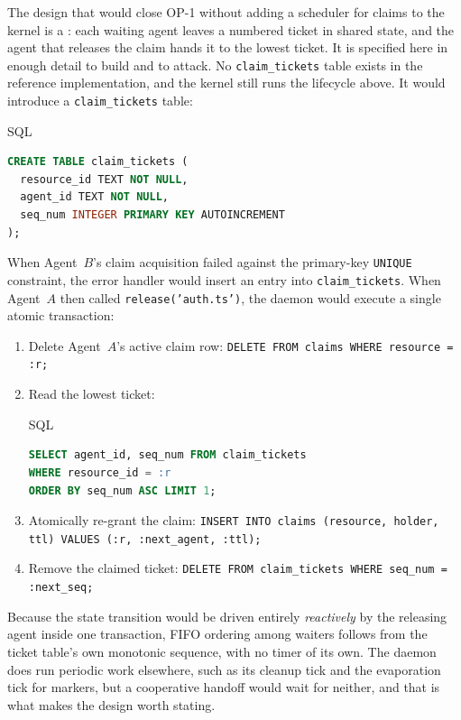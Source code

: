 \documentclass[11pt,a4paper]{article}
\theoremstyle{definition}
\theoremstyle{remark}
\begin{document}
The design that would close OP-1 without adding a scheduler for claims to the
kernel is a : each waiting agent leaves a
numbered ticket in shared state, and the agent that releases the claim hands it
to the lowest ticket. It is specified here in enough detail to build and to
attack. No \texttt{claim\_tickets} table exists in the reference
implementation, and the kernel still runs the lifecycle above. It would introduce a \texttt{claim\_tickets} table:
%
\begin{pdlisting}{SQL}{}
\begin{lstlisting}[language=SQL]
CREATE TABLE claim_tickets (
  resource_id TEXT NOT NULL,
  agent_id TEXT NOT NULL,
  seq_num INTEGER PRIMARY KEY AUTOINCREMENT
);
\end{lstlisting}
\end{pdlisting}
When Agent~$B$'s claim acquisition failed against the primary-key \texttt{UNIQUE} constraint, the error handler would insert an entry into \texttt{claim\_tickets}. When Agent~$A$ then called \texttt{release('auth.ts')}, the daemon would execute a single atomic transaction:
\begin{enumerate}[leftmargin=1.4em,itemsep=1pt]
\item Delete Agent~$A$'s active claim row: \texttt{DELETE FROM claims WHERE resource = :r;}
\item Read the lowest ticket:
\begin{pdlisting}{SQL}{}
\begin{lstlisting}[language=SQL,basicstyle=\small\ttfamily]
SELECT agent_id, seq_num FROM claim_tickets
WHERE resource_id = :r
ORDER BY seq_num ASC LIMIT 1;
\end{lstlisting}
\end{pdlisting}
\item Atomically re-grant the claim: \texttt{INSERT INTO claims (resource, holder, ttl) VALUES (:r, :next\_agent, :ttl);}
\item Remove the claimed ticket: \texttt{DELETE FROM claim\_tickets WHERE seq\_num = :next\_seq;}
\end{enumerate}
Because the state transition would be driven entirely \emph{reactively} by the
releasing agent inside one transaction, FIFO ordering among waiters follows from the
ticket table's own monotonic sequence, with no timer of its own. The daemon does
run periodic work elsewhere, such as its cleanup tick and the evaporation tick for
markers, but a cooperative handoff would wait for neither, and that is what makes
the design worth stating.
\end{document}
